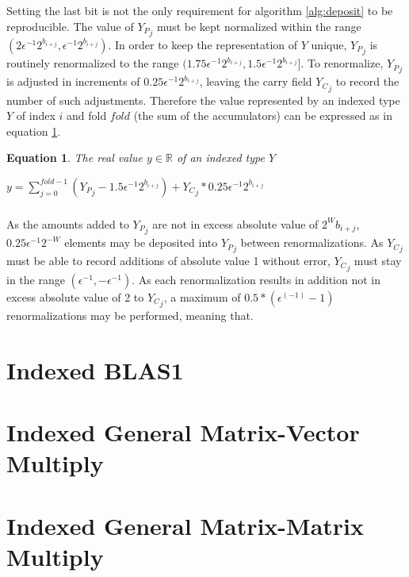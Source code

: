 \documentclass[12pt]{article}
\providecommand{\R}{\ensuremath{\mathbb{R}}}
\theoremstyle{plain}
\newtheorem{eq}{Equation}[section]
\begin{document}
      Setting the last bit is not the only requirement for algorithm \ref{alg:deposit} to be reproducible. The value of ${Y_P}_j$ must be kept normalized within the range $(2 \epsilon^{-1} 2^{b_{i + j}}, \epsilon^{-1} 2^{b_{i + j}})$. In order to keep the representation of $Y$ unique, ${Y_P}_j$ is routinely renormalized to the range $(1.75 \epsilon^{-1} 2^{b_{i + j}}, 1.5 \epsilon^{-1} 2^{b_{i + j}}]$.
      To renormalize, ${Y_P}_j$ is adjusted in increments of $0.25 \epsilon^{-1} 2^{b_{i + j}}$, leaving the carry field ${Y_C}_j$ to record the number of such adjustments. Therefore the value represented by an indexed type $Y$ of index $i$ and fold $fold$ (the sum of the accumulators) can be expressed as in equation \ref{eq:indexedvalue}.
      \begin{eq} The real value $y \in \R$ of an indexed type $Y$

        $y = \sum\limits_{j = 0}^{fold - 1} ({Y_P}_j - 1.5 \epsilon^{-1}2^{b_{i + j}}) + {Y_C}_j * 0.25\epsilon^{-1}2^{b_{i + j}}$
        \label{eq:indexedvalue}
      \end{eq}
    \subsubsection{}




As the amounts added to ${Y_P}_j$ are not in excess absolute value of $2^W b_{i + j}$, $0.25\epsilon^{-1}2^{-W}$ elements may be deposited into ${Y_P}_j$ between renormalizations. As ${Y_C}_j$ must be able to record additions of absolute value 1 without error, ${Y_C}_j$ must stay in the range $(\epsilon^{-1}, -\epsilon^{-1})$. As each renormalization results in addition not in excess absolute value of 2 to ${Y_C}_j$, a maximum of $0.5 * (\epsilon^(-1) - 1)$ renormalizations may be performed, meaning that.


      


\section{Indexed BLAS1}
\section{Indexed General Matrix-Vector Multiply}
\section{Indexed General Matrix-Matrix Multiply}
\end{document}
